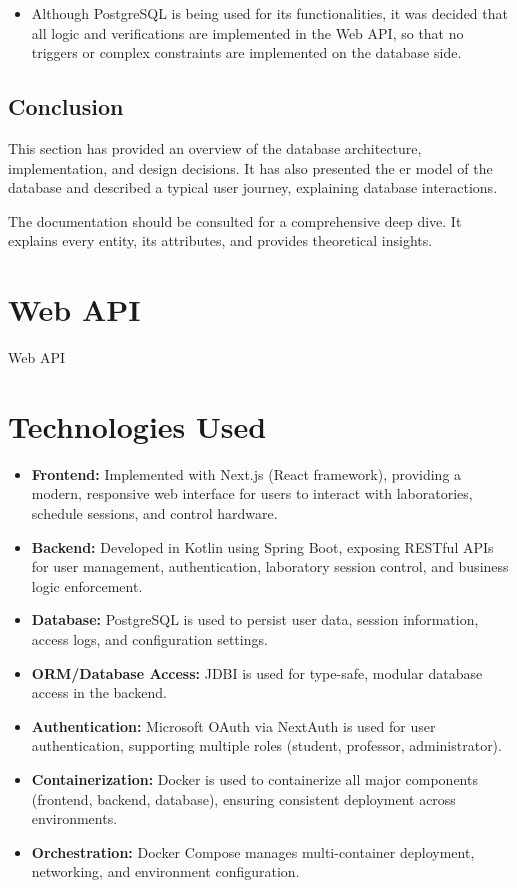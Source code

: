 \begin{itemize}
    \item Although PostgreSQL is being used for its functionalities, it was decided that all logic and verifications are implemented in the Web API, so that no triggers or complex constraints are implemented on the database side.
\end{itemize}

\subsection{Conclusion}
This section has provided an overview of the database architecture, implementation, and design decisions. It has also presented the \acs{er model} of the database and described a typical user journey, explaining database interactions.

The documentation should be consulted for a comprehensive deep dive. It explains every entity, its attributes, and provides theoretical insights.

\section{Web API}
Web API





\section{Technologies Used}

\begin{itemize}
    \item \textbf{Frontend:} Implemented with Next.js (React framework), providing a modern, responsive web interface for users to interact with laboratories, schedule sessions, and control hardware.
    \item \textbf{Backend:} Developed in Kotlin using Spring Boot, exposing RESTful APIs for user management, authentication, laboratory session control, and business logic enforcement.
    \item \textbf{Database:} PostgreSQL is used to persist user data, session information, access logs, and configuration settings.
    \item \textbf{ORM/Database Access:} JDBI is used for type-safe, modular database access in the backend.
    \item \textbf{Authentication:} Microsoft OAuth via NextAuth is used for user authentication, supporting multiple roles (student, professor, administrator).
    \item \textbf{Containerization:} Docker is used to containerize all major components (frontend, backend, database), ensuring consistent deployment across environments.
    \item \textbf{Orchestration:} Docker Compose manages multi-container deployment, networking, and environment configuration.
\end{itemize}

